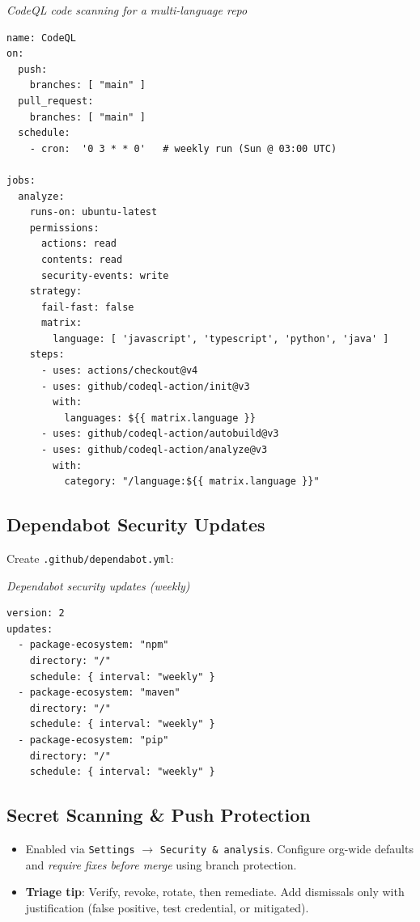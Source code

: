 \documentclass[10pt,a4paper]{article}
\begin{document}
\vspace{0.5em}
\noindent\textit{CodeQL code scanning for a multi-language repo}
\begin{verbatim}
name: CodeQL
on:
  push:
    branches: [ "main" ]
  pull_request:
    branches: [ "main" ]
  schedule:
    - cron:  '0 3 * * 0'   # weekly run (Sun @ 03:00 UTC)

jobs:
  analyze:
    runs-on: ubuntu-latest
    permissions:
      actions: read
      contents: read
      security-events: write
    strategy:
      fail-fast: false
      matrix:
        language: [ 'javascript', 'typescript', 'python', 'java' ]
    steps:
      - uses: actions/checkout@v4
      - uses: github/codeql-action/init@v3
        with:
          languages: ${{ matrix.language }}
      - uses: github/codeql-action/autobuild@v3
      - uses: github/codeql-action/analyze@v3
        with:
          category: "/language:${{ matrix.language }}"
\end{verbatim}

\subsection*{Dependabot Security Updates}
\noindent Create \texttt{.github/dependabot.yml}:

\vspace{0.5em}
\noindent\textit{Dependabot security updates (weekly)}
\begin{verbatim}
version: 2
updates:
  - package-ecosystem: "npm"
    directory: "/"
    schedule: { interval: "weekly" }
  - package-ecosystem: "maven"
    directory: "/"
    schedule: { interval: "weekly" }
  - package-ecosystem: "pip"
    directory: "/"
    schedule: { interval: "weekly" }
\end{verbatim}

\subsection*{Secret Scanning \& Push Protection}
\begin{itemize}
  \item Enabled via \texttt{Settings} $\rightarrow$ \texttt{Security \& analysis}. Configure org-wide defaults and \emph{require fixes before merge} using branch protection.
  \item \textbf{Triage tip}: Verify, revoke, rotate, then remediate. Add dismissals only with justification (false positive, test credential, or mitigated).
\end{itemize}
\end{document}
